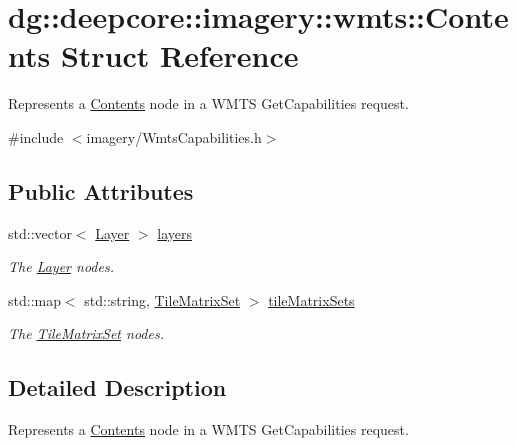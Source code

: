 \hypertarget{structdg_1_1deepcore_1_1imagery_1_1wmts_1_1_contents}{}\section{dg\+:\+:deepcore\+:\+:imagery\+:\+:wmts\+:\+:Contents Struct Reference}
\label{structdg_1_1deepcore_1_1imagery_1_1wmts_1_1_contents}


Represents a \hyperlink{structdg_1_1deepcore_1_1imagery_1_1wmts_1_1_contents}{Contents} node in a W\+M\+TS Get\+Capabilities request.  




{\ttfamily \#include $<$imagery/\+Wmts\+Capabilities.\+h$>$}

\subsection*{Public Attributes}
\begin{DoxyCompactItemize}
\item 
std\+::vector$<$ \hyperlink{structdg_1_1deepcore_1_1imagery_1_1wmts_1_1_layer}{Layer} $>$ \hyperlink{structdg_1_1deepcore_1_1imagery_1_1wmts_1_1_contents_ac634257db9b4a3bcfd653425212d7eb2}{layers}
\begin{DoxyCompactList}\small\item\em The \hyperlink{structdg_1_1deepcore_1_1imagery_1_1wmts_1_1_layer}{Layer} nodes. \end{DoxyCompactList}\item 
std\+::map$<$ std\+::string, \hyperlink{structdg_1_1deepcore_1_1imagery_1_1wmts_1_1_tile_matrix_set}{Tile\+Matrix\+Set} $>$ \hyperlink{structdg_1_1deepcore_1_1imagery_1_1wmts_1_1_contents_afa21421460450c381d86310758710a51}{tile\+Matrix\+Sets}
\begin{DoxyCompactList}\small\item\em The \hyperlink{structdg_1_1deepcore_1_1imagery_1_1wmts_1_1_tile_matrix_set}{Tile\+Matrix\+Set} nodes. \end{DoxyCompactList}\end{DoxyCompactItemize}


\subsection{Detailed Description}
Represents a \hyperlink{structdg_1_1deepcore_1_1imagery_1_1wmts_1_1_contents}{Contents} node in a W\+M\+TS Get\+Capabilities request. 

